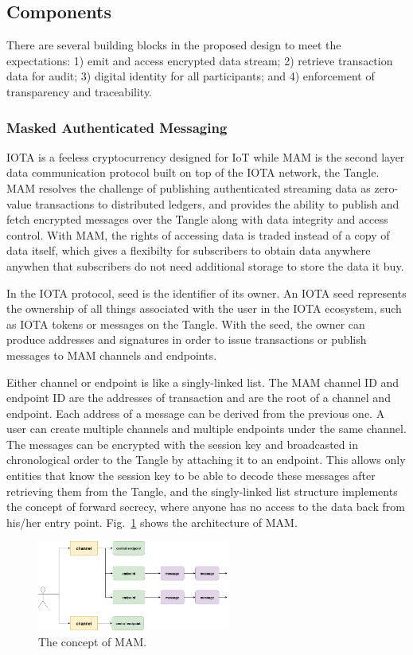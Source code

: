 \documentclass[conference]{IEEEtran}
\begin{document}
\subsection{Components}
There are several building blocks in the proposed design to meet the expectations: 1) emit and access encrypted data stream; 2) retrieve transaction data for audit; 3) digital identity for all participants; and 4) enforcement of transparency and traceability.


\subsubsection{Masked Authenticated Messaging}
IOTA is a feeless cryptocurrency designed for IoT while MAM is the second layer data communication protocol built on top of the IOTA network, the Tangle. MAM resolves the challenge of publishing authenticated streaming data as zero-value transactions to distributed ledgers, and provides the ability to publish and fetch encrypted messages over the Tangle along with data integrity and access control.
With MAM, the rights of accessing data is traded instead of a copy of data itself, which gives a flexibilty for subscribers to obtain data anywhere anywhen that subscribers do not need additional storage to store the data it buy.
 
In the IOTA protocol, seed is the identifier of its owner. An IOTA seed represents the ownership of all things associated with the user in the IOTA ecosystem, such as IOTA tokens or messages on the Tangle. With the seed, the owner can produce addresses and signatures in order to issue transactions or publish messages to MAM channels and endpoints.

Either channel or endpoint is like a singly-linked list. The MAM channel ID and endpoint ID are the addresses of transaction and are the root of a channel and endpoint. Each address of a message can be derived from the previous one. A user can create multiple channels and multiple endpoints under the same channel. The messages can be encrypted with the session key and broadcasted in chronological order to the Tangle by attaching it to an endpoint. This allows only entities that know the session key to be able to decode these messages after retrieving them from the Tangle, and the singly-linked list structure implements the concept of forward secrecy, where anyone has no access to the data back from his/her entry point. Fig.~\ref{fig:mam_struct} shows the architecture of MAM.

\begin{figure}[!t]
    \centering
    \includegraphics[width=2.5in]{mam_struct}
    \caption{The concept of MAM.}
    \label{fig:mam_struct}
\end{figure}
\end{document}
